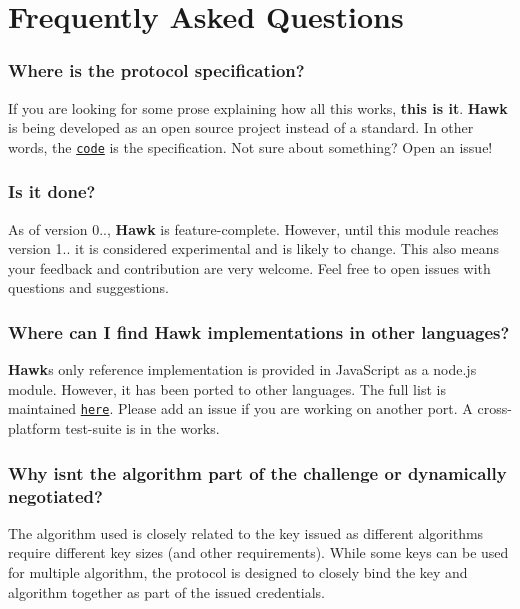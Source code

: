 \section*{Frequently Asked Questions}

\subsubsection*{Where is the protocol specification?}

If you are looking for some prose explaining how all this works, {\bfseries this is it}. {\bfseries Hawk} is being developed as an open source project instead of a standard. In other words, the \href{/hueniverse/hawk/tree/master/lib}{\tt code} is the specification. Not sure about something? Open an issue!

\subsubsection*{Is it done?}

As of version 0.., {\bfseries Hawk} is feature-\/complete. However, until this module reaches version 1.. it is considered experimental and is likely to change. This also means your feedback and contribution are very welcome. Feel free to open issues with questions and suggestions.

\subsubsection*{Where can I find {\bfseries Hawk} implementations in other languages?}

{\bfseries Hawk}\textquotesingle{}s only reference implementation is provided in Java\+Script as a node.\+js module. However, it has been ported to other languages. The full list is maintained \href{https://github.com/hueniverse/hawk/issues?labels=port&state=closed}{\tt here}. Please add an issue if you are working on another port. A cross-\/platform test-\/suite is in the works.

\subsubsection*{Why isn\textquotesingle{}t the algorithm part of the challenge or dynamically negotiated?}

The algorithm used is closely related to the key issued as different algorithms require different key sizes (and other requirements). While some keys can be used for multiple algorithm, the protocol is designed to closely bind the key and algorithm together as part of the issued credentials.

